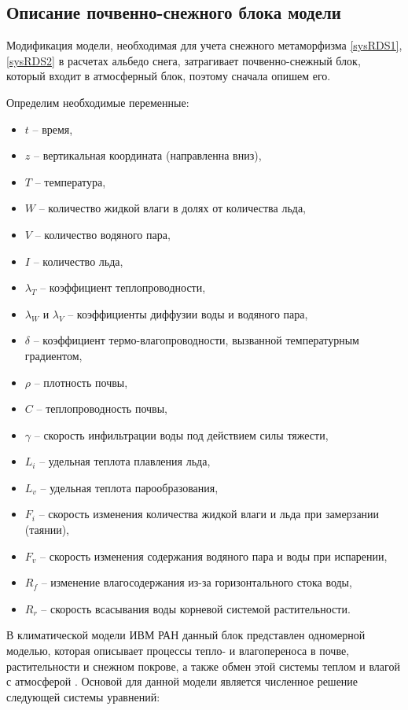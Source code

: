 \documentclass[a4paper, fontsize=14pt]{scrartcl}
\begin{document}
\subsection{Описание почвенно-снежного блока модели}

Модификация модели, необходимая для учета снежного метаморфизма \eqref{sysRDS1},\eqref{sysRDS2} в расчетах альбедо снега, затрагивает почвенно-снежный блок, который входит в атмосферный блок, поэтому сначала опишем его. 

Определим необходимые переменные:
\begin{itemize}
    \item $t$ -- время, 
    \item $z$ -- вертикальная координата (направленна вниз), 
    \item $T$ -- температура, 
    \item $W$ -- количество жидкой влаги в долях от количества льда, 
    \item $V$ -- количество водяного пара, 
    \item $I$ -- количество льда, 
    \item $\lambda_T$ -- коэффициент теплопроводности, 
    \item $\lambda_W$ и $\lambda_V$ -- коэффициенты диффузии воды и водяного пара, 
    \item $\delta$ -- коэффициент термо-влагопроводности, вызванной температурным градиентом, 
    \item $\rho$ -- плотность почвы, 
    \item $C$ -- теплопроводность почвы, 
    \item $\gamma$ -- скорость инфильтрации воды под действием силы тяжести, 
    \item $L_i$ -- удельная теплота плавления льда, 
    \item $L_v$ -- удельная теплота парообразования, 
    \item $F_i$ -- скорость изменения количества жидкой влаги и льда при замерзании (таянии), 
    \item $F_v$ -- скорость изменения содержания водяного пара и воды при испарении, 
    \item $R_f$ -- изменение влагосодержания из-за горизонтального стока воды, 
    \item $R_r$ -- скорость всасывания воды корневой системой растительности.
\end{itemize} 

В климатической модели ИВМ РАН данный блок представлен одномерной моделью, которая описывает процессы тепло- и влагопереноса в почве, растительности и снежном покрове, а также обмен этой системы теплом и влагой с атмосферой \cite{Volodin1998, Volodina2000}. Основой для данной модели является численное решение следующей системы уравнений:
\end{document}
